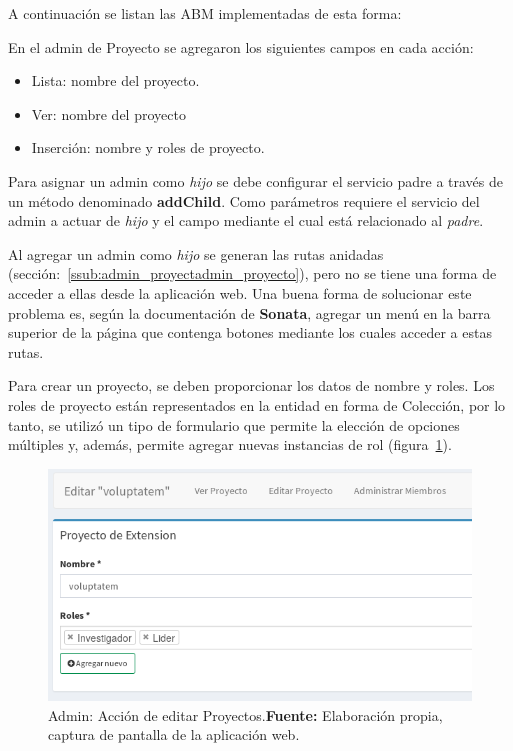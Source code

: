 A continuación se listan las ABM implementadas de esta forma:

\begin{itemize}
        
\end{itemize}



En el admin de Proyecto se agregaron los siguientes campos en cada acción:

\begin{itemize}
    \item Lista: nombre del proyecto.
    \item Ver: nombre del proyecto
    \item Inserción: nombre y roles de proyecto.
\end{itemize}

Para asignar un admin como \textit{hijo} se debe configurar el servicio padre a través de un método denominado \textbf{addChild}. Como parámetros requiere el servicio
del admin a actuar de \textit{hijo} y el campo mediante el cual está relacionado al \textit{padre}.


Al agregar un admin como \textit{hijo} se generan las rutas anidadas (sección:~\ref{ssub:admin_proyectadmin_proyecto}), pero no se tiene una forma de acceder a
ellas desde la aplicación web\@. Una buena forma de solucionar este problema es, según la documentación de \textbf{Sonata}, agregar un menú en la barra superior
de la página que contenga botones mediante los cuales acceder a estas rutas.\parencite{sonata-childAdmin}


Para crear un proyecto, se deben proporcionar los datos de nombre y roles. Los roles de proyecto están representados en la entidad en forma de Colección,
por lo tanto, se utilizó un tipo de formulario que permite la elección de opciones múltiples y, además, permite agregar nuevas instancias de
rol (figura~\ref{fig:image/proyecto-editar}).

\begin{figure}[h]
    \includegraphics[width=1\linewidth]{image/edit-proyecto.png}
    \caption{Admin: Acción de  editar Proyectos.\newline \textbf{Fuente:} Elaboración propia, captura de pantalla de la aplicación web.}
    \label{fig:image/proyecto-editar}
\end{figure}
\newpage
{}%


